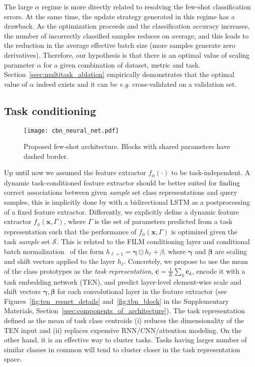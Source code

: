 \documentclass{article}
\renewcommand{\vec}[1]{\mathbf{#1}}
\newcommand{\examples}[1]{\mathcal{S}_{#1}}
\begin{document}
The large $\alpha$ regime is more directly related to resolving the few-shot classification errors. At the same time, the update strategy generated in this regime has a drawback. As the optimization proceeds and the classification accuracy increases, the number of incorrectly classified samples reduces on average, and this leads to the reduction in the average effective batch size (more samples generate zero derivatives). Therefore, our hypothesis is that there is an optimal value of scaling parameter $\alpha$ for a given combination of dataset, metric and task. Section~\ref{ssec:multitask_ablation} empirically demonstrates that the optimal value of $\alpha$ indeed exists and it can be \emph{e.g.} cross-validated on a validation set.


\subsection{Task conditioning} \label{ssec:tbn_architechture}
\begin{figure}[t]
    \centering
    \texttt{[image: cbn\_neural\_net.pdf]}
    \caption{Proposed few-shot architecture. Blocks with shared parameters have dashed border.}
    \label{fig:cbn_architecture}
\end{figure}

Up until now we assumed the feature extractor $f_{\phi}(\cdot)$ to be task-independent. A dynamic task-conditioned feature extractor should be better suited for finding correct associations between given \emph{sample} set class representations and query samples, this is implicitly done by \citet{vinyals2016matching} with a bidirectional LSTM as a postprocessing of a fixed feature extractor. Differently, we explicitly define a dynamic feature extractor $f_{\phi}(\vec{x}, \Gamma)$, where $\Gamma$ is the set of parameters predicted from a task representation such that the performance of $f_{\phi}(\vec{x}, \Gamma)$ is optimized given the task \emph{sample} set $\examples{}$. This is related to the FILM conditioning layer \citep{perez2017film} and conditional batch normalization~\citep{Dumoulin2017learned,Perez2017LearningVR} of the form $h_{\ell+1} = \bm{\gamma} \odot h_{\ell} + \beta$, where $\bm{\gamma}$ and $\bm{\beta}$ are scaling and shift vectors applied to the layer $h_{\ell}$. Concretely, we propose to use the mean of the class prototypes as the \emph{task representation}, $\overline{\vec{c}} = \frac{1}{K}\sum_k \vec{c}_k$, encode it with a task embedding network (TEN), and predict layer-level element-wise scale and shift vectors $\bm{\gamma}, \bm{\beta}$ for each convolutional layer in the feature extractor (see Figures~\ref{fig:ten_resnet_details} and~\ref{fig:tbn_block} in the Supplementary Materials, Section~\ref{ssec:components_of_architecture}). The task representation defined as the mean of task class centroids (i) reduces the dimensionality of the TEN input and (ii) replaces expensive RNN/CNN/attention modeling. On the other hand, it is an effective way to cluster tasks. Tasks having larger number of similar classes in common will tend to cluster closer in the task representation space.
 
\end{document}
